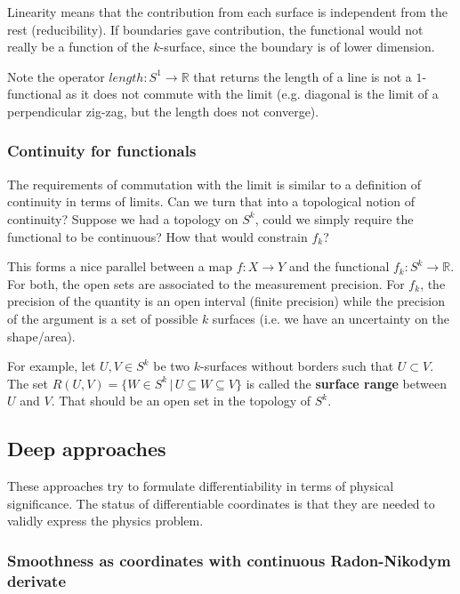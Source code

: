 \documentclass[10pt, onecolumn, longbibliography, nofootinbib]{revtex4-2}
\begin{document}
\begin{remark}
	Linearity means that the contribution from each surface is independent from the rest (reducibility). If boundaries gave contribution, the functional would not really be a function of the $k$-surface, since the boundary is of lower dimension.
	
	Note the operator $length : S^1 \to \mathbb{R}$ that returns the length of a line is not a $1$-functional as it does not commute with the limit (e.g. diagonal is the limit of a perpendicular zig-zag, but the length does not converge).
\end{remark}

\subsubsection{Continuity for functionals}

The requirements of commutation with the limit is similar to a definition of continuity in terms of limits. Can we turn that into a topological notion of continuity? Suppose we had a topology on $S^k$, could we simply require the functional to be continuous? How that would constrain $f_k$?

This forms a nice parallel between a map $f : X \to Y$ and the functional $f_k : S^k \to \mathbb{R}$. For both, the open sets are associated to the measurement precision. For $f_k$, the precision of the quantity is an open interval (finite precision) while the precision of the argument is a set of possible $k$ surfaces (i.e. we have an uncertainty on the shape/area).

For example, let $U, V \in S^k$ be two $k$-surfaces without borders such that $U \subset V$. The set $R(U,V) = \{ W \in S^k \, | \, U \subseteq W \subseteq V\}$ is called the \textbf{surface range} between $U$ and $V$. That should be an open set in the topology of $S^k$.

\subsection{Deep approaches}

These approaches try to formulate differentiability in terms of physical significance. The status of differentiable coordinates is that they are needed to validly express the physics problem.

\subsubsection{Smoothness as coordinates with continuous Radon-Nikodym derivate}
\end{document}
